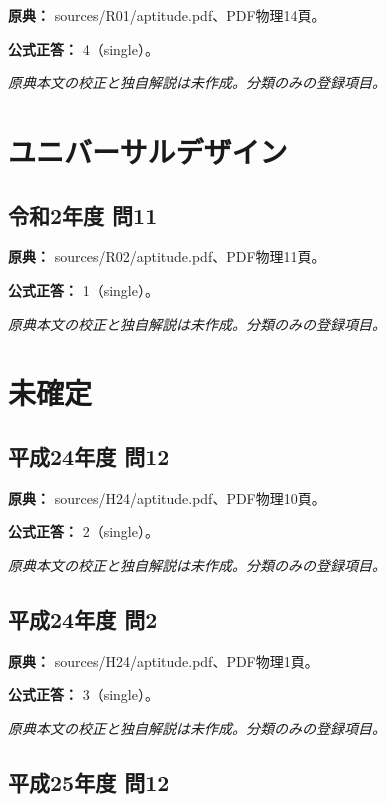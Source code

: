 \noindent\textbf{原典：} sources/R01/aptitude.pdf、PDF物理14頁。

\textbf{公式正答：} 4（single）。

\par\textit{原典本文の校正と独自解説は未作成。分類のみの登録項目。}

\section{ユニバーサルデザイン}

\subsection{令和2年度 問11}
\label{q:r02-reg-apt-11}

\noindent\textbf{原典：} sources/R02/aptitude.pdf、PDF物理11頁。

\textbf{公式正答：} 1（single）。

\par\textit{原典本文の校正と独自解説は未作成。分類のみの登録項目。}

\section{未確定}

\subsection{平成24年度 問12}
\label{q:h24-reg-apt-12}

\noindent\textbf{原典：} sources/H24/aptitude.pdf、PDF物理10頁。

\textbf{公式正答：} 2（single）。

\par\textit{原典本文の校正と独自解説は未作成。分類のみの登録項目。}

\subsection{平成24年度 問2}
\label{q:h24-reg-apt-02}

\noindent\textbf{原典：} sources/H24/aptitude.pdf、PDF物理1頁。

\textbf{公式正答：} 3（single）。

\par\textit{原典本文の校正と独自解説は未作成。分類のみの登録項目。}

\subsection{平成25年度 問12}
\label{q:h25-reg-apt-12}

